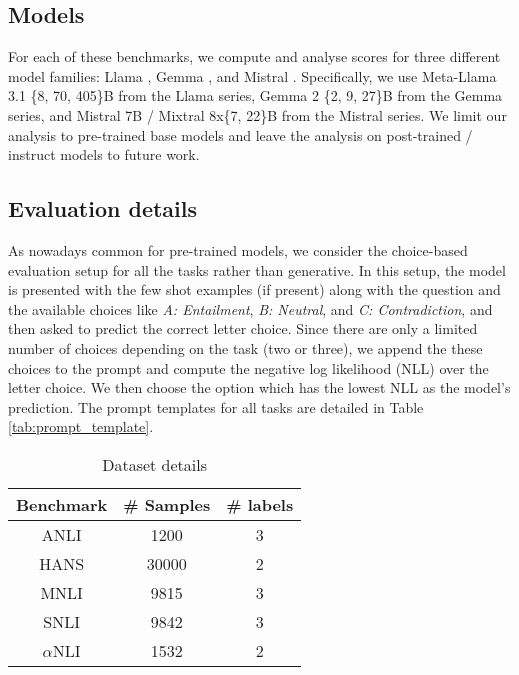 

\subsection{Models} For each of these benchmarks, we compute and analyse scores for three different model families: Llama \citep{dubey2024llama}, Gemma \citep{team2024gemma}, and Mistral \citep{jiang2023mistral, jiang2024mixtral}. 
Specifically, we use Meta-Llama 3.1 \{8, 70, 405\}B from the Llama series, Gemma 2 \{2, 9, 27\}B from the Gemma series, and Mistral 7B / Mixtral 8x\{7, 22\}B from the Mistral series.
We limit our analysis to pre-trained base models and leave the analysis on post-trained / instruct models to future work.

\subsection{Evaluation details}
As nowadays common for pre-trained models, we consider the choice-based evaluation setup for all the tasks rather than generative. 
In this setup, the model is presented with the few shot examples (if present) along with the question and the available choices like \textit{A: Entailment}, \textit{B: Neutral}, and \textit{C: Contradiction}, and then asked to predict the correct letter choice. 
Since there are only a limited number of choices depending on the task (two or three), we append the these choices to the prompt and compute the negative log likelihood (NLL) over the letter choice. 
We then choose the option which has the lowest NLL as the model's prediction. 
The prompt templates for all tasks are detailed in Table \ref{tab:prompt_template}.



\begin{table}
  \centering
  \begin{tabular}{c|c|c}
    Benchmark & \# Samples & \# labels \\
    \hline
    ANLI & 1200 & 3 \\
    HANS & 30000 & 2 \\
    MNLI & 9815 & 3 \\
    SNLI & 9842 & 3 \\
    $\alpha$NLI & 1532 & 2 \\
  \end{tabular}
\caption{Dataset details}
\label{tab:dataset}
\end{table}
